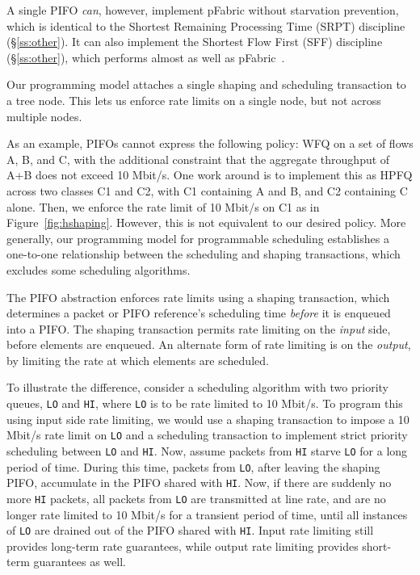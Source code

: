 A single PIFO {\em can}, however, implement pFabric without starvation prevention,
which is identical to the Shortest Remaining Processing Time (SRPT) discipline
(\S\ref{ss:other}).  It can also implement the Shortest Flow First (SFF)
discipline (\S\ref{ss:other}), which performs almost as well as
pFabric~\cite{pFabric}.

  Our
programming model attaches a single shaping and scheduling transaction
to a tree node. This lets us enforce rate limits on a single node, but not
across multiple nodes.

As an example, PIFOs cannot express the following policy: WFQ on a set of flows
A, B, and C, with the additional constraint that the aggregate throughput of
A+B does not exceed 10 Mbit/s. One work around is to implement this as HPFQ
across two classes C1 and C2, with C1 containing A and B, and C2 containing C
alone. Then, we enforce the rate limit of 10 Mbit/s on C1 as in
Figure~\ref{fig:hshaping}. However, this is not equivalent to our desired
policy. More generally, our programming model for programmable scheduling
establishes a one-to-one relationship between the scheduling and shaping
transactions, which excludes some scheduling algorithms.

 The PIFO abstraction enforces rate limits using a
shaping transaction, which determines a packet or PIFO reference's scheduling
time {\em before} it is enqueued into a PIFO.  The shaping transaction permits
rate limiting on the {\em input} side, \ie before elements are enqueued. An
alternate form of rate limiting is on the {\em output}, \ie by limiting the
rate at which elements are scheduled.

To illustrate the difference, consider a scheduling algorithm with two
priority queues, \texttt{LO} and \texttt{HI}, where \texttt{LO} is to
be rate limited to 10 Mbit/s. To program this using input side rate
limiting, we would use a shaping transaction to impose a 10 Mbit/s
rate limit on \texttt{LO} and a scheduling transaction to implement
strict priority scheduling between \texttt{LO} and \texttt{HI}. Now,
assume packets from \texttt{HI} starve \texttt{LO} for a long
period of time. During this time, packets from \texttt{LO}, after
leaving the shaping PIFO, accumulate in the PIFO shared with
\texttt{HI}. Now, if there are suddenly no more \texttt{HI} packets,
all packets from \texttt{LO} are transmitted at line rate, and are no
longer rate limited to 10 Mbit/s for a transient period of time,
\ie until all instances of \texttt{LO} are drained out of the PIFO
shared with \texttt{HI}. Input rate limiting still provides long-term
rate guarantees, while output rate limiting provides short-term
guarantees as well.
